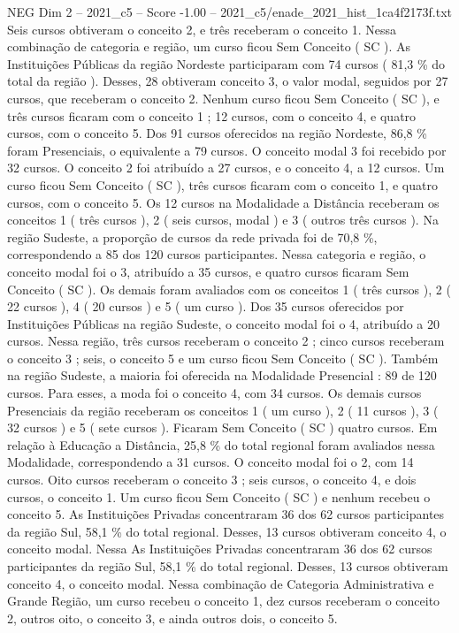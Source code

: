 \begin{textsample}{NEG Dim 2 – 2021\_c5 – Score -1.00 – 2021\_c5/enade\_2021\_hist\_1ca4f2173f.txt}
Seis cursos obtiveram o conceito 2, e três receberam o conceito 1.
Nessa combinação de categoria e região, um curso ficou Sem Conceito ( SC ).
As Instituições Públicas da região Nordeste participaram com 74 cursos ( 81,3 \% do total da região ).
Desses, 28 obtiveram conceito 3, o valor modal, seguidos por 27 cursos, que receberam o conceito 2.
Nenhum curso ficou Sem Conceito ( SC ), e três cursos ficaram com o conceito 1 ; 12 cursos, com o conceito 4, e quatro cursos, com o conceito 5.
Dos 91 cursos oferecidos na região Nordeste, 86,8 \% foram Presenciais, o equivalente a 79 cursos.
O conceito modal 3 foi recebido por 32 cursos.
O conceito 2 foi atribuído a 27 cursos, e o conceito 4, a 12 cursos.
Um curso ficou Sem Conceito ( SC ), três cursos ficaram com o conceito 1, e quatro cursos, com o conceito 5.
Os 12 cursos na Modalidade a Distância receberam os conceitos 1 ( três cursos ), 2 ( seis cursos, modal ) e 3 ( outros três cursos ).
Na região Sudeste, a proporção de cursos da rede privada foi de 70,8 \%, correspondendo a 85 dos 120 cursos participantes.
Nessa categoria e região, o conceito modal foi o 3, atribuído a 35 cursos, e quatro cursos ficaram Sem Conceito ( SC ).
Os demais foram avaliados com os conceitos 1 ( três cursos ), 2 ( 22 cursos ), 4 ( 20 cursos ) e 5 ( um curso ).
Dos 35 cursos oferecidos por Instituições Públicas na região Sudeste, o conceito modal foi o 4, atribuído a 20 cursos.
Nessa região, três cursos receberam o conceito 2 ; cinco cursos receberam o conceito 3 ; seis, o conceito 5 e um curso ficou Sem Conceito ( SC ).
Também na região Sudeste, a maioria foi oferecida na Modalidade Presencial : 89 de 120 cursos.
Para esses, a moda foi o conceito 4, com 34 cursos.
Os demais cursos Presenciais da região receberam os conceitos 1 ( um curso ), 2 ( 11 cursos ), 3 ( 32 cursos ) e 5 ( sete cursos ).
Ficaram Sem Conceito ( SC ) quatro cursos.
Em relação à Educação a Distância, 25,8 \% do total regional foram avaliados nessa Modalidade, correspondendo a 31 cursos.
O conceito modal foi o 2, com 14 cursos.
Oito cursos receberam o conceito 3 ; seis cursos, o conceito 4, e dois cursos, o conceito 1.
Um curso ficou Sem Conceito ( SC ) e nenhum recebeu o conceito 5.
As Instituições Privadas concentraram 36 dos 62 cursos participantes da região Sul, 58,1 \% do total regional.
Desses, 13 cursos obtiveram conceito 4, o conceito modal.
Nessa As Instituições Privadas concentraram 36 dos 62 cursos participantes da região Sul, 58,1 \% do total regional.
Desses, 13 cursos obtiveram conceito 4, o conceito modal.
Nessa combinação de Categoria Administrativa e Grande Região, um curso recebeu o conceito 1, dez cursos receberam o conceito 2, outros oito, o conceito 3, e ainda outros dois, o conceito 5.

\end{textsample}
